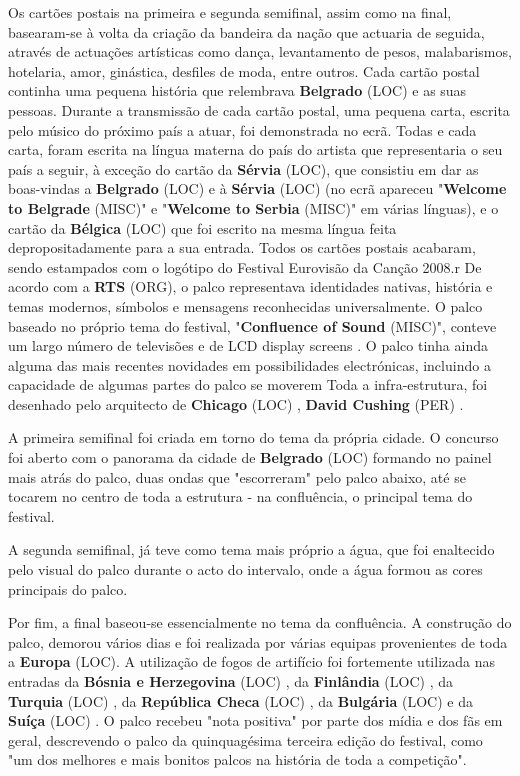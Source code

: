 \documentclass[12pt,a4paper]{article}
\begin{document}
Os cartões postais na primeira e segunda semifinal, assim como na final, basearam-se à volta da criação da bandeira da nação que actuaria de seguida, através de actuações artísticas como dança, levantamento de pesos, malabarismos, hotelaria, amor, ginástica, desfiles de moda, entre outros. Cada cartão postal continha uma pequena história que relembrava \textbf{Belgrado} (LOC) e as suas pessoas. Durante a transmissão de cada cartão postal, uma pequena carta, escrita pelo músico do próximo país a atuar, foi demonstrada no ecrã. Todas e cada carta, foram escrita na língua materna do país do artista que representaria o seu país a seguir, à exceção do cartão da \textbf{Sérvia} (LOC), que consistiu em dar as boas-vindas a \textbf{Belgrado} (LOC) e à \textbf{Sérvia} (LOC) (no ecrã apareceu "\textbf{Welcome to Belgrade} (MISC)" e "\textbf{Welcome to Serbia} (MISC)" em várias línguas), e o cartão da \textbf{Bélgica} (LOC) que foi escrito na mesma língua feita depropositadamente para a sua entrada. Todos os cartões postais acabaram, sendo estampados com o logótipo do Festival Eurovisão da Canção 2008.r De acordo com a \textbf{RTS} (ORG), o palco representava identidades nativas, história e temas modernos, símbolos e mensagens reconhecidas universalmente. O palco baseado no próprio tema do festival, "\textbf{Confluence of Sound} (MISC)", conteve um largo número de televisões e de LCD display screens . O palco tinha ainda alguma das mais recentes novidades em possibilidades electrónicas, incluindo a capacidade de algumas partes do palco se moverem Toda a infra-estrutura, foi desenhado pelo arquitecto de \textbf{Chicago} (LOC) , \textbf{David Cushing} (PER) .

A primeira semifinal foi criada em torno do tema da própria cidade. O concurso foi aberto com o panorama da cidade de \textbf{Belgrado} (LOC) formando no painel mais atrás do palco, duas ondas que "escorreram" pelo palco abaixo, até se tocarem no centro de toda a estrutura - na confluência, o principal tema do festival.

A segunda semifinal, já teve como tema mais próprio a água, que foi enaltecido pelo visual do palco durante o acto do intervalo, onde a água formou as cores principais do palco.

Por fim, a final baseou-se essencialmente no tema da confluência. A construção do palco, demorou vários dias e foi realizada por várias equipas provenientes de toda a \textbf{Europa} (LOC). A utilização de fogos de artifício foi fortemente utilizada nas entradas da \textbf{Bósnia e Herzegovina} (LOC) , da \textbf{Finlândia} (LOC) , da \textbf{Turquia} (LOC) , da \textbf{República Checa} (LOC) , da \textbf{Bulgária} (LOC) e da \textbf{Suíça} (LOC) . O palco recebeu "nota positiva" por parte dos mídia e dos fãs em geral, descrevendo o palco da quinquagésima terceira edição do festival, como "um dos melhores e mais bonitos palcos na história de toda a competição".
\end{document}
